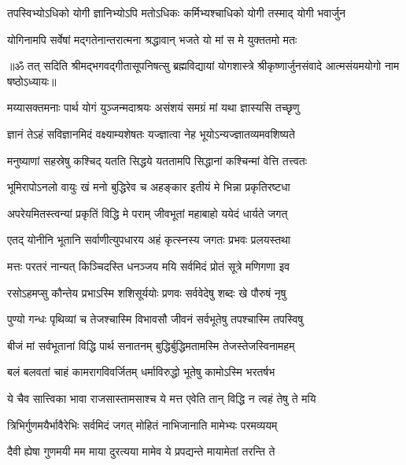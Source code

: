 \twolineshloka
{तपस्विभ्योऽधिको योगी ज्ञानिभ्योऽपि मतोऽधिकः}
{कर्मिभ्यश्चाधिको योगी तस्माद् योगी भवार्जुन}%

\twolineshloka
{योगिनामपि सर्वेषां मद्गतेनान्तरात्मना}
{श्रद्धावान् भजते यो मां स मे युक्ततमो मतः}%

{॥ॐ तत् सदिति श्रीमद्भगवद्गीतासूपनिषत्सु ब्रह्मविद्यायां योगशास्त्रे श्रीकृष्णार्जुनसंवादे आत्मसंयमयोगो नाम षष्ठोऽध्यायः॥}



\twolineshloka
{मय्यासक्तमनाः पार्थ योगं युञ्जन्मदाश्रयः}
{असंशयं समग्रं मां यथा ज्ञास्यसि तच्छृणु}%

\twolineshloka
{ज्ञानं तेऽहं सविज्ञानमिदं वक्ष्याम्यशेषतः}
{यज्ज्ञात्वा नेह भूयोऽन्यज्ज्ञातव्यमवशिष्यते}%

\twolineshloka
{मनुष्याणां सहस्रेषु कश्चिद् यतति सिद्धये}
{यततामपि सिद्धानां कश्चिन्मां वेत्ति तत्त्वतः}%

\twolineshloka
{भूमिरापोऽनलो वायुः खं मनो बुद्धिरेव च}
{अहङ्कार इतीयं मे भिन्ना प्रकृतिरष्टधा}%

\twolineshloka
{अपरेयमितस्त्वन्यां प्रकृतिं विद्धि मे पराम्}
{जीवभूतां महाबाहो ययेदं धार्यते जगत्}%

\twolineshloka
{एतद् योनीनि भूतानि सर्वाणीत्युपधारय}
{अहं कृत्स्नस्य जगतः प्रभवः प्रलयस्तथा}%

\twolineshloka
{मत्तः परतरं नान्यत् किञ्चिदस्ति धनञ्जय}
{मयि सर्वमिदं प्रोतं सूत्रे मणिगणा इव}%

\twolineshloka
{रसोऽहमप्सु कौन्तेय प्रभाऽस्मि शशिसूर्ययोः}
{प्रणवः सर्ववेदेषु शब्दः खे पौरुषं नृषु}%

\twolineshloka
{पुण्यो गन्धः पृथिव्यां च तेजश्चास्मि विभावसौ}
{जीवनं सर्वभूतेषु तपश्चास्मि तपस्विषु}%

\twolineshloka
{बीजं मां सर्वभूतानां विद्धि पार्थ सनातनम्}
{बुद्धिर्बुद्धिमतामस्मि तेजस्तेजस्विनामहम्}%

\twolineshloka
{बलं बलवतां चाहं कामरागविवर्जितम्}
{धर्माविरुद्धो भूतेषु कामोऽस्मि भरतर्षभ}%

\twolineshloka
{ये चैव सात्त्विका भावा राजसास्तामसाश्च ये}
{मत्त एवेति तान् विद्धि न त्वहं तेषु ते मयि}%

\twolineshloka
{त्रिभिर्गुणमयैर्भावैरेभिः सर्वमिदं जगत्}
{मोहितं नाभिजानाति मामेभ्यः परमव्ययम्}%

\twolineshloka
{दैवी ह्येषा गुणमयी मम माया दुरत्यया}
{मामेव ये प्रपद्यन्ते मायामेतां तरन्ति ते}%

